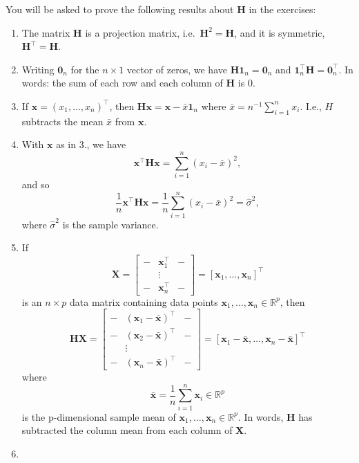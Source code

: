 \documentclass[
]{book}
\providecommand{\tightlist}{%
  \setlength{\itemsep}{0pt}\setlength{\parskip}{0pt}}
\theoremstyle{definition}
\theoremstyle{definition}
\theoremstyle{definition}
\theoremstyle{definition}
\theoremstyle{remark}
\begin{document}
You will be asked to prove the following results about \(\mathbf H\) in the exercises:

\begin{enumerate}
\def\labelenumi{\arabic{enumi}.}
\tightlist
\item
  The matrix \(\mathbf H\) is a projection matrix, i.e.~\(\mathbf H^2=\mathbf H\), and it is symmetric, \(\mathbf H^\top =\mathbf H\).
\item
  Writing \({\mathbf 0}_n\) for the \(n \times 1\) vector of zeros, we have
  \(\mathbf H{\mathbf 1}_n={\mathbf 0}_n\) and \({\mathbf 1}_n^\top \mathbf H={\mathbf 0}_n^\top.\) In words: the sum of each row and each column of \(\mathbf H\) is \(0\).
\item
  If \(\mathbf x=(x_1, \ldots , x_n)^\top\), then \(\mathbf H\mathbf x= \mathbf x- \bar{x}{\mathbf 1}_n\) where \(\bar{x}=n^{-1}\sum_{i=1}^n x_i\). I.e., \(H\) subtracts the mean \(\bar{x}\) from \(\mathbf x\).
\item
  With \(\mathbf x\) as in 3., we have
  \[
  \mathbf x^\top \mathbf H\mathbf x= \sum_{i=1}^n (x_i-\bar{x})^2,
  \]
  and so
  \[
  \frac{1}{n}\mathbf x^\top \mathbf H\mathbf x=\frac{1}{n}\sum_{i=1}^n (x_i-\bar{x})^2 = \hat{\sigma}^2,
  \]
  where \(\hat{\sigma}^2\) is the sample variance.
\item
  If
  \[\mathbf X=\left[\begin{array}{ccc}-&\mathbf x_1^\top&-\\ 
  &\vdots& \\ -&\mathbf x_n^\top&-\end{array}\right] = [\mathbf x_1, \ldots, \mathbf x_n]^\top\]
  is an \(n \times p\) data matrix containing data points \(\mathbf x_1, \ldots, \mathbf x_n\in \mathbb{R}^p\), then
  \[
  \mathbf H\mathbf X=\left[ \begin{array}{ccc}
  -&(\mathbf x_1-\bar{\mathbf x})^\top&-\\
  -&(\mathbf x_2 -\bar{\mathbf x})^\top&-\\
  &\vdots&\\
  -&(\mathbf x_n - \bar{\mathbf x})^\top&-
  \end{array}\right ]= \left[ \mathbf x_1 -\bar{\mathbf x}, \ldots , \mathbf x_n-\bar{\mathbf x}\right]^\top
  \]
  where \[\bar{\mathbf x} = \frac{1}{n} \sum_{i=1}^n \mathbf x_i \in \mathbb{R}^p\]
  is the p-dimensional sample mean of \(\mathbf x_1, \ldots, \mathbf x_n\in \mathbb{R}^p\). In words, \(\mathbf H\) has subtracted the column mean from each column of \(\mathbf X\).
\item

\end{enumerate}
\end{document}
